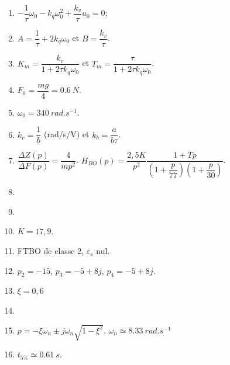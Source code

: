 \begin{solution}
\begin{enumerate}
\item $-\dfrac{1}{\tau}\omega_0 - k_q \omega_0^2 + \dfrac{k_v}{\tau}u_0=0$;
\item $A=\dfrac{1}{\tau}+2k_q\omega_0$ et $B=\dfrac{k_v}{\tau}$.
\item $K_m=\dfrac{k_v}{1+2\tau k_q \omega_0}$ et $T_m=\dfrac{\tau}{1+2\tau k_q \omega_0}$.
\item $F_0=\dfrac{mg}{4}=\SI{0,6}{N}$.
\item $\omega_0=\SI{340}{rad.s^{-1}}$.
\item $k_v=\dfrac{1}{b}$ (rad/s/V) et $k_b=\dfrac{a}{b\tau}$.
\item $\dfrac{\Delta Z(p)}{\Delta F(p)}=\dfrac{4}{mp^2}$. $H_{BO}(p)=\dfrac{2,5 K}{p^2}\dfrac{1+Tp}{\left( 1+\dfrac{p}{77}\right)\left(1+\dfrac{p}{30} \right)}$.
\item  $\quad$
\item $\quad$
\item $K=17,9$.
\item FTBO  de classe 2, $\varepsilon_s$ nul.
\item $p_2=-15$, $p_3 = -5+8j$, $p_4=-5+8j$.
\item $\xi=0,6$
\item $\quad$
\item $p=-\xi\omega_n \pm j\omega_n \sqrt{1-\xi^2}$. $\omega_n\simeq \SI{8,33}{rad.s^{-1}}$
\item $t_{5\%}\simeq \SI{0,61}{ s}$. 
\end{enumerate}
\end{solution} 
%
